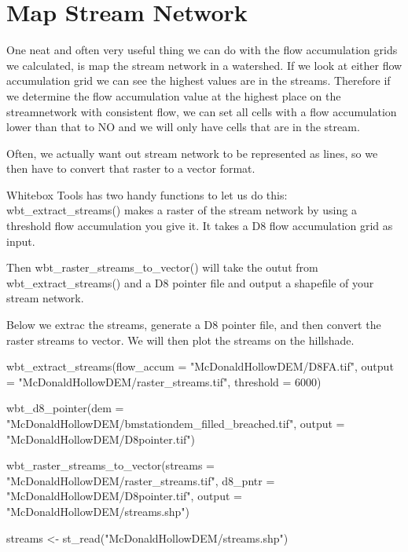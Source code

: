 \documentclass[
]{book}
\newenvironment{Shaded}{\begin{snugshade}}{\end{snugshade}}
\newcommand{\AttributeTok}[1]{\textcolor[rgb]{0.77,0.63,0.00}{#1}}
\newcommand{\DecValTok}[1]{\textcolor[rgb]{0.00,0.00,0.81}{#1}}
\newcommand{\FunctionTok}[1]{\textcolor[rgb]{0.00,0.00,0.00}{#1}}
\newcommand{\NormalTok}[1]{#1}
\newcommand{\OtherTok}[1]{\textcolor[rgb]{0.56,0.35,0.01}{#1}}
\newcommand{\StringTok}[1]{\textcolor[rgb]{0.31,0.60,0.02}{#1}}
\begin{document}
\hypertarget{map-stream-network}{%
\section{Map Stream Network}\label{map-stream-network}}

One neat and often very useful thing we can do with the flow accumulation grids we calculated, is map the stream network in a watershed. If we look at either flow accumulation grid we can see the highest values are in the streams. Therefore if we determine the flow accumulation value at the highest place on the streamnetwork with consistent flow, we can set all cells with a flow accumulation lower than that to NO and we will only have cells that are in the stream.

Often, we actually want out stream network to be represented as lines, so we then have to convert that raster to a vector format.

Whitebox Tools has two handy functions to let us do this: wbt\_extract\_streams() makes a raster of the stream network by using a threshold flow accumulation you give it. It takes a D8 flow accumulation grid as input.

Then wbt\_raster\_streams\_to\_vector() will take the outut from wbt\_extract\_streams() and a D8 pointer file and output a shapefile of your stream network.

Below we extrac the streams, generate a D8 pointer file, and then convert the raster streams to vector. We will then plot the streams on the hillshade.

\begin{Shaded}
\begin{Highlighting}[]
\FunctionTok{wbt\_extract\_streams}\NormalTok{(}\AttributeTok{flow\_accum =} \StringTok{"McDonaldHollowDEM/D8FA.tif"}\NormalTok{,}
                    \AttributeTok{output =} \StringTok{"McDonaldHollowDEM/raster\_streams.tif"}\NormalTok{,}
                    \AttributeTok{threshold =} \DecValTok{6000}\NormalTok{)}

\FunctionTok{wbt\_d8\_pointer}\NormalTok{(}\AttributeTok{dem =} \StringTok{"McDonaldHollowDEM/bmstationdem\_filled\_breached.tif"}\NormalTok{,}
               \AttributeTok{output =} \StringTok{"McDonaldHollowDEM/D8pointer.tif"}\NormalTok{)}

\FunctionTok{wbt\_raster\_streams\_to\_vector}\NormalTok{(}\AttributeTok{streams =} \StringTok{"McDonaldHollowDEM/raster\_streams.tif"}\NormalTok{,}
                             \AttributeTok{d8\_pntr =} \StringTok{"McDonaldHollowDEM/D8pointer.tif"}\NormalTok{,}
                             \AttributeTok{output =} \StringTok{"McDonaldHollowDEM/streams.shp"}\NormalTok{)}

\NormalTok{streams }\OtherTok{\textless{}{-}} \FunctionTok{st\_read}\NormalTok{(}\StringTok{"McDonaldHollowDEM/streams.shp"}\NormalTok{)}
\end{Highlighting}
\end{Shaded}
\end{document}

